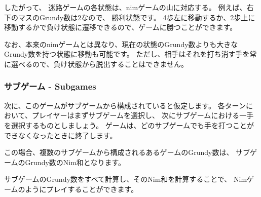 したがって、
迷路ゲームの各状態は、nimゲームの山に対応する。
例えば、右下のマスのGrundy数は2なので、
勝利状態です。
4歩左に移動するか、2歩上に移動するかで負け状態に遷移できるので、ゲームに勝つことができます。

なお、本来のnimゲームとは異なり、現在の状態のGrundy数よりも大きなGrundy数を持つ状態に移動も可能です。
ただし、相手はそれを打ち消す手を常に選べるので、負け状態から脱出することはできません。

\subsubsection{サブゲーム - Subgames}

次に、このゲームがサブゲームから構成されていると仮定します。
各ターンにおいて、プレイヤーはまずサブゲームを選択し、
次にサブゲームにおける一手を選択するものとしましょう。
ゲームは、どのサブゲームでも手を打つことができなくなったときに終了します。

この場合、複数のサブゲームから構成されるあるゲームのGrundy数は、
サブゲームのGrundy数のNim和となります。

サブゲームのGrundy数をすべて計算し、そのNim和を計算することで、
Nimゲームのようにプレイすることができます。


